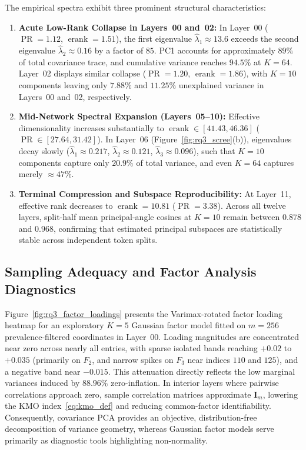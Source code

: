 \documentclass[12pt, a4paper, oneside]{report}
\theoremstyle{definition}
\newcommand{\mat}[1]{\mathbf{#1}}
\newcommand{\erank}{\operatorname{erank}}
\newcommand{\PR}{\operatorname{PR}}
\begin{document}
The empirical spectra exhibit three prominent structural characteristics:
\begin{enumerate}
    \item \textbf{Acute Low-Rank Collapse in Layers~00 and~02:} In Layer~00 ($\PR = 1.12$, $\erank = 1.51$), the first eigenvalue $\hat{\lambda}_1 \approx 13.6$ exceeds the second eigenvalue $\hat{\lambda}_2 \approx 0.16$ by a factor of $85$. PC1 accounts for approximately $89\%$ of total covariance trace, and cumulative variance reaches $94.5\%$ at $K = 64$. Layer~02 displays similar collapse ($\PR = 1.20$, $\erank = 1.86$), with $K = 10$ components leaving only $7.88\%$ and $11.25\%$ unexplained variance in Layers~00 and~02, respectively.
    \item \textbf{Mid-Network Spectral Expansion (Layers~05--10):} Effective dimensionality increases substantially to $\erank \in [41.43, 46.36]$ ($\PR \in [27.64, 31.42]$). In Layer~06 (Figure~\ref{fig:rq3_scree}(b)), eigenvalues decay slowly ($\hat{\lambda}_1 \approx 0.217$, $\hat{\lambda}_2 \approx 0.121$, $\hat{\lambda}_3 \approx 0.096$), such that $K = 10$ components capture only $20.9\%$ of total variance, and even $K = 64$ captures merely $\approx 47\%$.
    \item \textbf{Terminal Compression and Subspace Reproducibility:} At Layer~11, effective rank decreases to $\erank = 10.81$ ($\PR = 3.38$). Across all twelve layers, split-half mean principal-angle cosines at $K = 10$ remain between $0.878$ and $0.968$, confirming that estimated principal subspaces are statistically stable across independent token splits.
\end{enumerate}

\subsection{Sampling Adequacy and Factor Analysis Diagnostics}

Figure~\ref{fig:rq3_factor_loadings} presents the Varimax-rotated factor loading heatmap for an exploratory $K = 5$ Gaussian factor model fitted on $m = 256$ prevalence-filtered coordinates in Layer~00. Loading magnitudes are concentrated near zero across nearly all entries, with sparse isolated bands reaching $+0.02$ to $+0.035$ (primarily on $F_2$, and narrow spikes on $F_3$ near indices $110$ and $125$), and a negative band near $-0.015$. This attenuation directly reflects the low marginal variances induced by $88.96\%$ zero-inflation. In interior layers where pairwise correlations approach zero, sample correlation matrices approximate $\mat{I}_m$, lowering the KMO index~\eqref{eq:kmo_def} and reducing common-factor identifiability. Consequently, covariance PCA provides an objective, distribution-free decomposition of variance geometry, whereas Gaussian factor models serve primarily as diagnostic tools highlighting non-normality.
\end{document}
